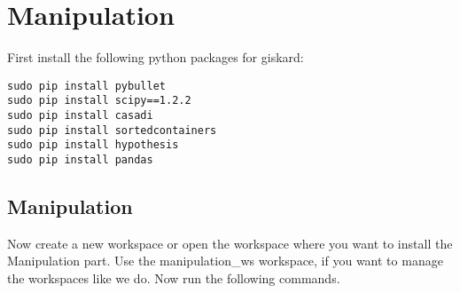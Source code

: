 \documentclass[main.tex]{subfiles}
\begin{document}
\section{Manipulation}
\label{sec:Manipulation}

First install the following python packages for giskard:

\begin{lstlisting}
sudo pip install pybullet
sudo pip install scipy==1.2.2
sudo pip install casadi
sudo pip install sortedcontainers
sudo pip install hypothesis
sudo pip install pandas
\end{lstlisting}
	
	\subsection{Manipulation}
Now create a new workspace or open the workspace where you want to install the Manipulation part. Use the manipulation\_ws workspace, if you want to manage the workspaces like we do. Now run the following commands.	

\begin{mdframed}[backgroundcolor=mygray, rightline=false]

\end{mdframed}
	
	
\end{document}

